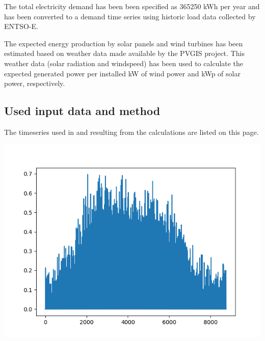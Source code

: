 \documentclass{article}[11pt]
\begin{document}
\begin{multicols}{2}
The total electricity demand has been been specified as 365250 kWh per year and has been converted to a demand time series using historic load data collected by ENTSO-E.

The expected energy production by solar panels and wind turbines has been estimated based on weather data made available by the PVGIS project. This weather data (solar radiation and windspeed) has been used to calculate the expected generated power per installed kW of wind power and kWp of solar power, respectively. \vfill\null\columnbreak\appendix

\subsection*{Used input data and method}

The timeseries used in and resulting from the calculations are listed on this page.

\begin{center}

\includegraphics[width=\linewidth]{per_unit_pv_generation.png}

\end{center}






\begin{center}


\end{center}
\end{multicols}
\end{document}
